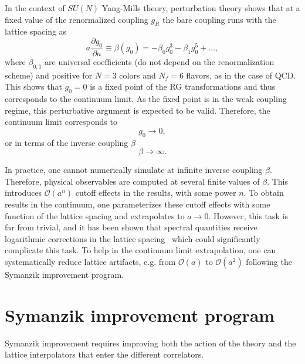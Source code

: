 In the context of $SU(N)$ Yang-Mills theory, perturbation theory shows that at a fixed value of the renormalized coupling $g_R$ the bare coupling runs with the lattice spacing as
\begin{equation}
\label{ch_foundation:eq:beta-func}
a\frac{\partial g_0}{\partial a}\equiv\beta(g_0)=-\beta_0g_0^3-\beta_1g_0^5+...,
\end{equation}
where $\beta_{0,1}$ are universal coefficients (do not depend on the renormalization scheme) and positive for $N=3$ colors and $N_f=6$ flavors, as in the case of QCD. This shows that $g_0=0$ is a fixed point of the RG transformations and thus corresponds to the continuum limit. As the fixed point is in the weak coupling regime, this perturbative argument is expected to be valid. Therefore, the continuum limit corresponds to
\begin{equation}
g_0\rightarrow0,
\end{equation}
or in terms of the inverse coupling $\beta$
\begin{equation}
\beta\rightarrow\infty.
\end{equation}

In practice, one cannot numerically simulate at infinite inverse coupling $\beta$. Therefore, physical observables are computed at several finite values of $\beta$. This introduces $\mathcal{O}(a^n)$ cutoff effects in the results, with some power $n$. To obtain results in the continuum, one parameterizes these cutoff effects with some function of the lattice spacing and extrapolates to $a\rightarrow 0$. However, this task is far from trivial, and it has been shown that spectral quantities receive logarithmic corrections in the lattice spacing~\citep{Husung:2022kvi} which could significantly complicate this task. To help in the continuum limit extrapolation, one can systematically reduce lattice artifacts, e.g. from $\mathcal{O}(a)$ to $\mathcal{O}(a^2)$ following the Symanzik improvement program. 


\section{Symanzik improvement program}
\label{ch_foundation:sec:impr}

Symanzik improvement requires improving both the action of the theory and the lattice interpolators that enter the different correlators. 

